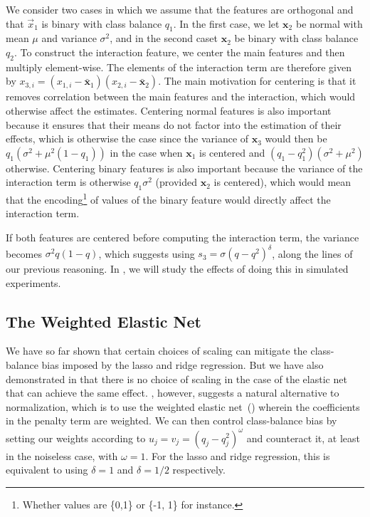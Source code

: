 We consider two cases in which we assume that the features are orthogonal and that
\(\vec{x}_1\) is binary with class balance \(q_1\). In the first case, we let \(\bm{x}_2\)
be normal with mean \(\mu\) and variance \(\sigma^2\), and in the second caset \(\bm{x}_2\)
be binary with class balance \(q_2\). To construct the interaction feature, we center the
main features and then multiply element-wise. The elements of the interaction term are
therefore given by \(x_{3,i} = (x_{1,i} - \bar{\bm{x}}_1)(x_{2,i} - \bar{\bm{x}}_2)\). The
main motivation for centering is that it removes correlation between the main features and
the interaction, which would otherwise affect the estimates. Centering normal features is
also important because it ensures that their means do not factor into the estimation of
their effects, which is otherwise the case since the variance of \(\bm{x}_3\) would then be
\(q_1(\sigma^2 + \mu^2(1 - q_1))\) in the case when \(\bm{x}_1\) is centered and \((q_1 -
q_1^2)(\sigma^2 + \mu^2)\) otherwise. Centering binary features is also important because
the variance of the interaction term is otherwise \(q_1\sigma^2\) (provided \(\bm{x}_2\) is
centered), which would mean that the encoding\footnote{Whether values are \{0,1\} or \{-1,
  1\} for instance.} of values of the binary feature would directly affect the interaction
term.

If both features are centered before computing the interaction term, the variance becomes
\(\sigma^2 q(1-q)\), which suggests using \(s_3 = \sigma (q - q^2)^\delta\), along the
lines of our previous reasoning. In , we will study the
effects of doing this in simulated experiments.

\subsection{The Weighted Elastic Net}\label{sec:binary-weighting}

We have so far shown that certain choices of scaling can mitigate the class-balance bias
imposed by the lasso and ridge regression. But we have also demonstrated in
 that there is no choice of scaling in the case of the
elastic net that can achieve the same effect. , however,
suggests a natural alternative to normalization, which is to use the weighted elastic
net~() wherein the coefficients in the penalty term are
weighted. We can then control class-balance bias by setting our weights according to \(u_j
= v_j = (q_j - q_j^2)^{\omega}\) and counteract it, at least in the noiseless case, with
\(\omega = 1\). For the lasso and ridge regression, this is equivalent to using \(\delta =
1\) and \(\delta = 1/2\) respectively.

